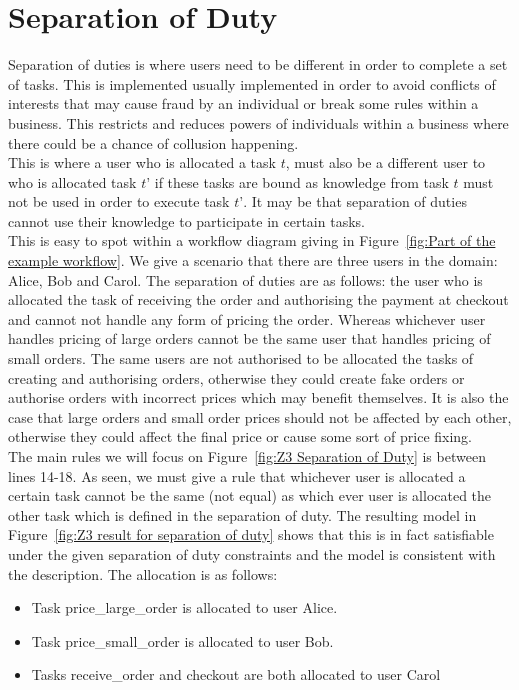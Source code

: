 \documentclass[a4paper]{report}
\begin{document}
\section{Separation of Duty}
Separation of duties\cite{sod} is where users need to be different in order to complete a set of tasks. This is implemented usually implemented in order to avoid conflicts of interests that may cause fraud by an individual or break some rules within a business. This restricts and reduces powers of individuals within a business where there could be a chance of collusion happening. \\
This is where a user who is allocated a task $t$, must also be a different user to who is allocated task $t’$ if these tasks are bound as knowledge from task $t$ must not be used in order to execute task $t’$. It may be that separation of duties cannot use their knowledge to participate in certain tasks.\\
This is easy to spot within a workflow diagram giving in Figure~\ref{fig:Part of the example workflow}. We give a scenario that there are three users in the domain: Alice, Bob and Carol. The separation of duties are as follows: the user who is allocated the task of receiving the order and authorising the payment at checkout and cannot not handle any form of pricing the order. Whereas whichever user handles pricing of large orders cannot be the same user that handles pricing of small orders. The same users are not authorised to be allocated the tasks of creating and authorising orders, otherwise they could create fake orders or authorise orders with incorrect prices which may benefit themselves. It is also the case that large orders and small order prices should not be affected by each other, otherwise they could affect the final price or cause some sort of price fixing.\\
The main rules we will focus on Figure~\ref{fig:Z3 Separation of Duty} is between lines 14-18. As seen, we must give a rule that whichever user is allocated a certain task cannot be the same (not equal) as which ever user is allocated the other task which is defined in the separation of duty. 
The resulting model in Figure~\ref{fig:Z3 result for separation of duty} shows that this is in fact satisfiable under the given separation of duty constraints and the model is consistent with the description. The allocation is as follows:
\begin{itemize}
\item Task price\_large\_order is allocated to user Alice.
\item Task price\_small\_order is allocated to user Bob.
\item Tasks receive\_order and checkout are both allocated to user Carol
\end{itemize}
\end{document}
